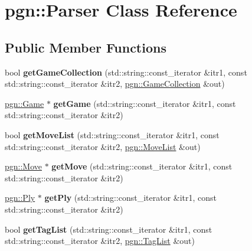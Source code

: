 \hypertarget{classpgn_1_1Parser}{
\section{pgn::Parser Class Reference}
\label{classpgn_1_1Parser}
}
\subsection*{Public Member Functions}
\begin{DoxyCompactItemize}
\item 
\hypertarget{classpgn_1_1Parser_a9feaee2ae6fc57fdfa7de8e405291082}{
bool {\bfseries getGameCollection} (std::string::const\_\-iterator \&itr1, const std::string::const\_\-iterator \&itr2, \hyperlink{classpgn_1_1GameCollection}{pgn::GameCollection} \&out)}
\label{classpgn_1_1Parser_a9feaee2ae6fc57fdfa7de8e405291082}

\item 
\hypertarget{classpgn_1_1Parser_a75fb06094fc412eb3197cda813ec7e5e}{
\hyperlink{classpgn_1_1Game}{pgn::Game} $\ast$ {\bfseries getGame} (std::string::const\_\-iterator \&itr1, const std::string::const\_\-iterator \&itr2)}
\label{classpgn_1_1Parser_a75fb06094fc412eb3197cda813ec7e5e}

\item 
\hypertarget{classpgn_1_1Parser_afbb1aee64b477bafca8ab2486b3e669f}{
bool {\bfseries getMoveList} (std::string::const\_\-iterator \&itr1, const std::string::const\_\-iterator \&itr2, \hyperlink{classpgn_1_1MoveList}{pgn::MoveList} \&out)}
\label{classpgn_1_1Parser_afbb1aee64b477bafca8ab2486b3e669f}

\item 
\hypertarget{classpgn_1_1Parser_a38ccb9809b26c90cebe525e342ffd6cc}{
\hyperlink{classpgn_1_1Move}{pgn::Move} $\ast$ {\bfseries getMove} (std::string::const\_\-iterator \&itr1, const std::string::const\_\-iterator \&itr2)}
\label{classpgn_1_1Parser_a38ccb9809b26c90cebe525e342ffd6cc}

\item 
\hypertarget{classpgn_1_1Parser_a4efc9cafd449f453b498691625137acd}{
\hyperlink{classpgn_1_1Ply}{pgn::Ply} $\ast$ {\bfseries getPly} (std::string::const\_\-iterator \&itr1, const std::string::const\_\-iterator \&itr2)}
\label{classpgn_1_1Parser_a4efc9cafd449f453b498691625137acd}

\item 
\hypertarget{classpgn_1_1Parser_aa75b1285609ed972cf7032b4c89d5a04}{
bool {\bfseries getTagList} (std::string::const\_\-iterator \&itr1, const std::string::const\_\-iterator \&itr2, \hyperlink{classpgn_1_1TagList}{pgn::TagList} \&out)}
\label{classpgn_1_1Parser_aa75b1285609ed972cf7032b4c89d5a04}


\end{DoxyCompactItemize}
